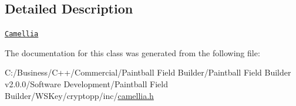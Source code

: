 \subsection{Detailed Description}
\href{http://www.weidai.com/scan-mirror/cs.html#Camellia}{\tt Camellia} 

The documentation for this class was generated from the following file:\begin{DoxyCompactItemize}
\item 
C:/Business/C++/Commercial/Paintball Field Builder/Paintball Field Builder v2.0.0/Software Development/Paintball Field Builder/WSKey/cryptopp/inc/\hyperlink{camellia_8h}{camellia.h}\end{DoxyCompactItemize}
